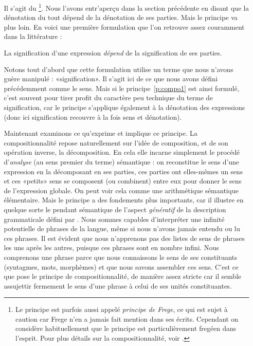 Il s'agit du %
\footnote{Le principe est parfois aussi appelé \emph{principe de
    Frege}, ce qui est sujet à caution car Frege n'en a jamais fait
    mention dans ses écrits.  Cependant on considère habituellement
    que le principe est particulièrement fregéen dans l'esprit.  Pour
    plus détails sur la compositionnalité, voir \citet{Part:84c}.}.
    Nous l'avons 
entr'aperçu dans la section précédente en disant que la dénotation du
tout dépend de la dénotation de ses parties.  Mais le principe va plus
loin.  En voici une première formulation que l'on retrouve assez
couramment dans la littérature :


\begin{princ}
\label{p:compo1}
La signification d'une expression \emph{dépend} de la signification de ses
parties. 
\end{princ}


Notons tout d'abord que cette formulation utilise un terme que nous
n'avons guère manipulé : «signification».  Il s'agit ici de ce que
nous avons défini précédemment comme le sens.  Mais si le
principe~\ref{p:compo1} est ainsi formulé, c'est souvent pour tirer
profit du caractère peu technique du terme de signification, car le
principe s'applique également à la dénotation des expressions (donc
ici signification recouvre à la fois sens et dénotation).  

Maintenant examinons ce qu'exprime et implique ce principe.  La
compositionnalité repose naturellement sur l'idée de composition, et
de son opération inverse, la décomposition. En cela elle incarne
simplement le procédé d'\emph{analyse} (au sens premier du terme)
sémantique : on reconstitue le sens d'une expression en la décomposant
en ses parties, ces parties ont elles-mêmes un sens et ces
«petits» sens se composent (ou combinent) entre eux pour donner le
sens de l'expression globale.  On peut voir cela comme une
arithmétique sémantique élémentaire.  Mais le principe a des
fondements plus importants, car il illustre en quelque sorte le
pendant sémantique de l'aspect \emph{génératif} de la description
grammaticale défini par \citet{Chom:57}.  Nous
sommes capables 
d'interpréter une infinité potentielle de phrases de la langue, même
si nous n'avons jamais entendu ou lu ces phrases.  Il est évident que
nous n'apprenons pas des listes de sens de phrases les uns après les
autres, puisque ces phrases sont en nombre infini.  Nous comprenons
une phrase parce que nous connaissons le sens de ses constituants
(syntagmes, mots, morphèmes) et que nous savons assembler ces sens.
C'est ce que pose le principe de compositionnalité, de manière assez
stricte car il semble assujettir fermement le sens d'une phrase à
celui de ses unités constituantes.

